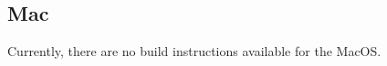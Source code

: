 \documentclass[a4paper,10pt]{article}
\begin{document}
\subsection{Mac}
Currently, there are no build instructions available for the MacOS.
%


\end{document}

